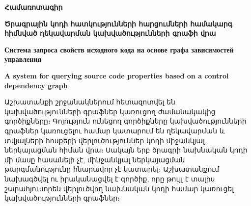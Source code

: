 {
	\thispagestyle{plain}
	\begin{center}
		\large
		\textbf{Համառոտագիր}
	\end{center}

	\begin{center}
		\vspace{0.5cm}

		\large
		\textbf{Ծրագրային կոդի հատկությունների հարցումների համակարգ հիմնված ղեկավարման կախվածությունների գրաֆի վրա}

		\vspace{0.2cm}
		\textbf{Система запроса свойств исходного кода на основе графа зависимостей управления}

		\vspace{0.2cm}
		\textbf{A system for querying source code properties based on a control dependency graph}

		\vspace{0.5cm}

	\end{center}
	Աշխատանքի շրջանակներում հետազոտվել են կախվածությունների գրաֆներ կառուցող ժամանակակից գործիքները։
	Գոյություն ունեցող գործիքները կախվածությունների գրաֆներ կառուցելու համար կատարում են ղեկավարման և
	տվյալների հոսքերի վերլուծություններ կոդի միջանկյալ ներկայացման հիման վրա։ Սակայն երբ ծրագրի նախնական
	կոդի մի մասը հասանելի չէ, մինջանկյալ ներկայացման թարգմանությունը հնարավոր չէ կատարել։ Աշխատանքում
	նախագծվել ու իրականացվել է գործիք, որը թույլ է տալիս շարահյուսորեն վերլուծվող նախնական կոդի համար
	կառուցել կախվածությունների գրաֆներ։
}